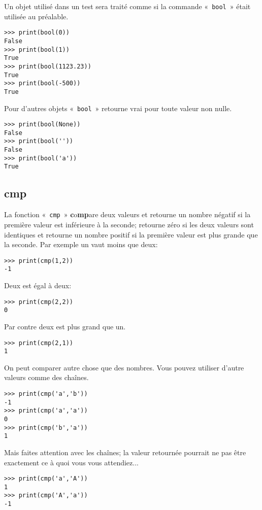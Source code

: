 Un objet utilisé dans un test sera traité comme si la commande «~\texttt{bool}~» était utilisée au préalable. 
\begin{Verbatim}[frame=single,rulecolor=\color{gray}]
>>> print(bool(0))
False
>>> print(bool(1))
True
>>> print(bool(1123.23))
True
>>> print(bool(-500))
True
\end{Verbatim}

Pour d'autres objets «~\texttt{bool}~» retourne vrai pour toute valeur non nulle.
\begin{Verbatim}[frame=single,rulecolor=\color{gray}]
>>> print(bool(None))
False
>>> print(bool(''))
False
>>> print(bool('a'))
True 
\end{Verbatim}

\subsection*{cmp}
La fonction «~\texttt{cmp}~»  \textbf{c}o\textbf{mp}are deux valeurs et retourne un nombre négatif si la première valeur est inférieure à la seconde; retourne zéro si les deux valeurs sont identiques et retourne un nombre positif si la première valeur est plus grande que la seconde. Par exemple un vaut moins que deux:
\begin{Verbatim}[frame=single,rulecolor=\color{gray}]
>>> print(cmp(1,2))
-1
\end{Verbatim}

Deux est égal à deux:
\begin{Verbatim}[frame=single,rulecolor=\color{gray}]
>>> print(cmp(2,2))
0
\end{Verbatim}

Par contre deux est plus grand que un.
\begin{Verbatim}[frame=single,rulecolor=\color{gray}]
>>> print(cmp(2,1))
1
\end{Verbatim}

On peut comparer autre chose que des nombres. Vous pouvez utiliser d'autre valeurs comme des chaînes.
\begin{Verbatim}[frame=single,rulecolor=\color{gray}]
>>> print(cmp('a','b'))
-1
>>> print(cmp('a','a'))
0
>>> print(cmp('b','a'))
1
\end{Verbatim}

Mais faites attention avec les chaînes; la valeur retournée pourrait ne pas être exactement ce à quoi vous vous attendiez...
\begin{Verbatim}[frame=single,rulecolor=\color{gray}]
>>> print(cmp('a','A'))
1
>>> print(cmp('A','a'))
-1
\end{Verbatim}

